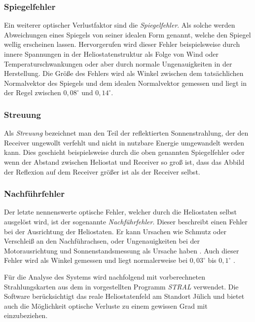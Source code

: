 \subsubsection*{Spiegelfehler} \label{subsubsec_Spiegelfehler}
Ein weiterer optischer Verlustfaktor sind die \textit{Spiegelfehler}.
Als solche werden Abweichungen eines Spiegels von seiner idealen Form genannt, welche den Spiegel wellig erscheinen lassen.
Hervorgerufen wird dieser Fehler beispielsweise durch innere Spannungen in der Heliostatenstruktur als Folge von Wind oder Temperaturschwankungen oder aber durch normale Ungenauigkeiten in der Herstellung.
Die Größe des Fehlers wird als Winkel zwischen dem tatsächlichen Normalvektor des Spiegels und dem idealen Normalvektor gemessen und liegt in der Regel zwischen $0,08^\circ$ und $0,14^\circ$. \cite[S.16]{DissBelhomme}

\subsubsection*{Streuung} \label{subsubsec_Streuung}
Als \textit{Streuung} bezeichnet man den Teil der reflektierten Sonnenstrahlung, der den Receiver ungewollt verfehlt und nicht in nutzbare Energie umgewandelt werden kann.
Dies geschieht beispielsweise durch die oben genannten Spiegelfehler oder wenn der Abstand zwischen Heliostat und Receiver so groß ist, dass das Abbild der Reflexion auf dem Receiver größer ist als der Receiver selbst. \cite[S.15-16]{DissBelhomme}

\subsubsection*{Nachführfehler} \label{subsubsec_Nachführfehler}
Der letzte nennenswerte optische Fehler, welcher durch die Heliostaten selbst ausgelöst wird, ist der sogenannte \textit{Nachführfehler}.
Dieser beschreibt einen Fehler bei der Ausrichtung der Heliostaten.
Er kann Ursachen wie Schmutz oder Verschleiß an den Nachführachsen, oder Ungenauigkeiten bei der Motorausrichtung und Sonnenstandsmessung als Ursache haben \cite[S.7]{Richter}. Auch dieser Fehler wird als Winkel gemessen und liegt normalerweise bei $0,03^\circ$ bis $0,1^\circ$ \cite[S.17]{DissBelhomme}.

Für die Analyse des Systems wird nachfolgend mit vorberechneten Strahlungskarten aus dem in \cite[S.53ff]{DissBelhomme} vorgestellten Programm \textit{STRAL} verwendet.
Die Software berücksichtigt das reale Heliostatenfeld am Standort Jülich und bietet auch die Möglichkeit optische Verluste zu einem gewissen Grad mit einzubeziehen.


